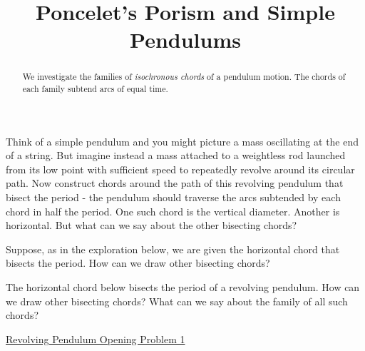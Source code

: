 \documentclass{ximera}
\title{Poncelet's Porism and Simple Pendulums}
\begin{document}
\begin{abstract}
We investigate the families of \emph{isochronous chords} of a pendulum motion. The chords of each family subtend arcs of equal time.
\end{abstract}
\maketitle



Think of a simple pendulum and you might picture a mass oscillating at the end of a string. But imagine instead a mass attached to a weightless rod launched from its low point with sufficient speed to repeatedly revolve around its circular path. Now construct chords around the path of this revolving pendulum that bisect the period - the pendulum should traverse the arcs subtended by each chord in half the period. One such chord is the vertical diameter. Another is horizontal. But what can we say about the other bisecting chords?

Suppose, as in the exploration below, we are given the horizontal chord that bisects the period. How can we draw other bisecting chords?

\begin{exploration}
The horizontal chord below bisects the period of a revolving pendulum. How can we draw other bisecting chords? What can we say about the family of all such chords?

\begin{onlineOnly}
    \begin{center}
\end{center}
\end{onlineOnly}

\href{https://www.desmos.com/calculator/x5fzsfvxdb}{Revolving Pendulum Opening Problem 1}

\end{exploration}
\end{document}
